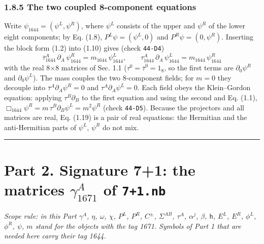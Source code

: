 \documentclass[
  10pt,
]{article}
\begin{document}
\hypertarget{the-two-coupled-8-component-equations}{%
\subsubsection{1.8.5 The two coupled 8-component
equations}\label{the-two-coupled-8-component-equations}}

Write \(\psi_{1644}=(\psi^{L},\psi^{R})\), where \(\psi^{L}\) consists
of the upper and \(\psi^{R}\) of the lower eight components; by Eq.
(1.8), \(P^{L}\psi=(\psi^{L},0)\) and \(P^{R}\psi=(0,\psi^{R})\).
Inserting the block form (1.2) into (1.10) gives (check \texttt{44-D4})
\[\boxed{\;\bar\tau_{1644}^A\,\partial_A\,\psi_{1644}^{R}=m_{1644}\,\psi_{1644}^{L},\qquad\tau_{1644}^A\,\partial_A\,\psi_{1644}^{L}=m_{1644}\,\psi_{1644}^{R}\;}\tag{1.19}\]
with the real 8×8 matrices of Sec. 1.1 (\(\tau^0=\bar\tau^0=1_8\), so
the first terms are \(\partial_0\psi^{R}\) and \(\partial_0\psi^{L}\)).
The mass couples the two 8-component fields; for \(m=0\) they decouple
into \(\bar\tau^A\partial_A\psi^{R}=0\) and
\(\tau^A\partial_A\psi^{L}=0\). Each field obeys the Klein--Gordon
equation: applying \(\tau^B\partial_B\) to the first equation and using
the second and Eq. (1.1),
\(\Box_{1644}\psi^{R}=m\,\tau^B\partial_B\psi^{L}=m^2\psi^{R}\) (check
\texttt{44-D5}). Because the projectors and all matrices are real, Eq.
(1.19) is a pair of real equations: the Hermitian and the anti-Hermitian
parts of \(\psi^{L}\), \(\psi^{R}\) do not mix.

\begin{center}\rule{0.5\linewidth}{0.5pt}\end{center}

\hypertarget{part-2.-signature-71-the-matrices-gamma_1671a-of-71.nb}{%
\section{\texorpdfstring{Part 2. Signature 7+1: the matrices
\(\gamma_{1671}^A\) of
\texttt{7+1.nb}}{Part 2. Signature 7+1: the matrices \textbackslash gamma\_\{1671\}\^{}A of 7+1.nb}}\label{part-2.-signature-71-the-matrices-gamma_1671a-of-71.nb}}

\emph{Scope rule: in this Part \(\gamma^A\), \(\eta\), \(\omega\),
\(\chi\), \(P^{L}\), \(P^{R}\), \(C^{\pm}\), \(\Sigma^{AB}\),
\(\tau^A\), \(\alpha^j\), \(\beta\), \(\mathsf{h}\), \(E^{L}\),
\(E^{R}\), \(\phi^{L}\), \(\phi^{R}\), \(\psi\), \(m\) stand for the
objects with the tag 1671. Symbols of Part 1 that are needed here carry
their tag 1644.}
\end{document}
